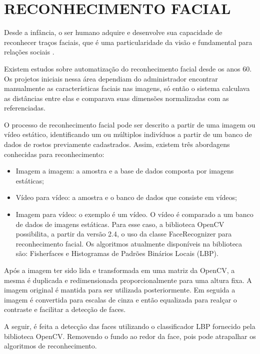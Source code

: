 \section{RECONHECIMENTO FACIAL}\label{sec:reconhecimento}

Desde a infância, o ser humano adquire e desenvolve sua capacidade de reconhecer traços faciais, 
que é uma particularidade da visão e fundamental para relações sociais \cite{rouhani2019}.

Existem estudos sobre automatização do reconhecimento facial desde os anos 60. Os projetos iniciais nessa 
área dependiam do administrador encontrar manualmente as características faciais nas imagens, só 
então o sistema calculava as distâncias entre elas e comparava suas dimensões normalizadas com 
as referenciadas.

O processo de reconhecimento facial pode ser descrito a partir de uma imagem ou vídeo estático, 
identificando um ou múltiplos indivíduos a partir de um banco de dados de rostos previamente 
cadastrados. Assim, existem três abordagens conhecidas para reconhecimento:

\begin{itemize}
    \item Imagem a imagem: a amostra e a base de dados composta por imagens estáticas;

    \item Vídeo para vídeo: a amostra e o banco de dados que consiste em vídeos;

    \item Imagem para vídeo: o exemplo é um vídeo. O vídeo é comparado a um banco de 
    dados de imagens estáticas. Para esse caso, a biblioteca OpenCV possibilita,
     a partir da versão 2.4, o uso da classe FaceRecognizer para reconhecimento 
     facial. Os algoritmos atualmente disponíveis na biblioteca são: Fisherfaces 
     e Histogramas de Padrões Binários Locais (LBP).
\end{itemize}

Após a imagem ter sido lida e transformada em uma matriz da OpenCV, a mesma é
duplicada e redimensionada proporcionalmente para uma altura fixa. A imagem original 
é mantida para ser utilizada posteriormente. Em seguida a imagem é convertida para 
escalas de cinza e então equalizada para realçar o contraste e facilitar a detecção de faces.

A seguir, é feita a detecção das faces utilizando o classificador LBP
fornecido pela biblioteca OpenCV. Removendo o fundo ao redor da face, pois 
pode atrapalhar os algoritmos de reconhecimento.

